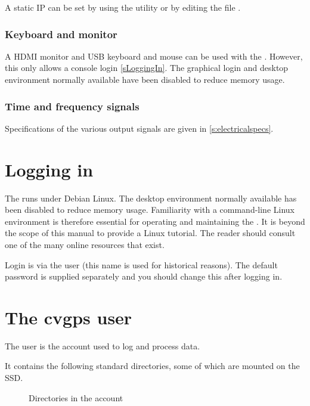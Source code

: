 A static IP can be set by using the utility  or by editing the file 
.

\subsubsection{Keyboard and monitor}

A HDMI monitor and USB keyboard and mouse can be used with the \sysname{}. 
However, this only allows a console login \ref{sLoggingIn}.
The graphical login and desktop environment normally available have been disabled to reduce memory usage.


\subsubsection{Time and frequency signals}

Specifications of the various output signals are given in \ref{s:electricalspecs}.

\section{Logging in \label{sLoggingIn}}

The \sysname{} runs under Debian Linux. The desktop environment normally available has been disabled to reduce memory usage.
Familiarity with a command-line Linux environment is therefore essential for operating and maintaining
the \sysname{}. It is beyond the scope of this manual to provide a Linux tutorial. The reader should 
consult one of the many online resources that exist.

Login is via the user  (this name is used for historical reasons). 
The default password is supplied separately and you should change
this after logging in.

\section{The cvgps user}

The  user is the account used to log and process data.

It contains the following standard directories, some of which are mounted on the SSD.

\begin{figure}[h]
\caption{Directories in the  account}
\end{figure}

